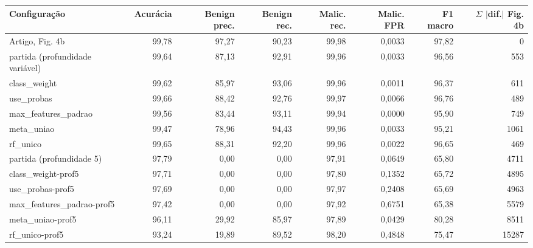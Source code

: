 \begin{tabular}{lrrrrrrr}
\hline
\textbf{Configuração} & \textbf{Acurácia} & \textbf{Benign prec.} & \textbf{Benign rec.} & \textbf{Malic. rec.} & \textbf{Malic. FPR} & \textbf{F1 macro} & \textbf{$\Sigma$ $|$dif.$|$ Fig. 4b} \\ \hline
Artigo, Fig. 4b & 99,78 & 97,27 & 90,23 & 99,98 & 0,0033 & 97,82 & 0 \\
\hline
partida (profundidade variável) & 99,64 & 87,13 & 92,91 & 99,96 & 0,0033 & 96,56 & 553 \\
class\_weight & 99,62 & 85,97 & 93,06 & 99,96 & 0,0011 & 96,37 & 611 \\
use\_probas & 99,66 & 88,42 & 92,76 & 99,97 & 0,0066 & 96,76 & 489 \\
max\_features\_padrao & 99,56 & 83,44 & 93,11 & 99,94 & 0,0000 & 95,90 & 749 \\
meta\_uniao & 99,47 & 78,96 & 94,43 & 99,96 & 0,0033 & 95,21 & 1061 \\
rf\_unico & 99,65 & 88,31 & 92,20 & 99,96 & 0,0022 & 96,65 & 469 \\
\hline
partida (profundidade 5) & 97,79 & 0,00 & 0,00 & 97,91 & 0,0649 & 65,80 & 4711 \\
class\_weight-prof5 & 97,71 & 0,00 & 0,00 & 97,80 & 0,1352 & 65,72 & 4895 \\
use\_probas-prof5 & 97,69 & 0,00 & 0,00 & 97,97 & 0,2408 & 65,69 & 4963 \\
max\_features\_padrao-prof5 & 97,42 & 0,00 & 0,00 & 97,92 & 0,6751 & 65,38 & 5579 \\
meta\_uniao-prof5 & 96,11 & 29,92 & 85,97 & 97,89 & 0,0429 & 80,28 & 8511 \\
rf\_unico-prof5 & 93,24 & 19,89 & 89,52 & 98,20 & 0,4848 & 75,47 & 15287 \\
\hline
\end{tabular}
